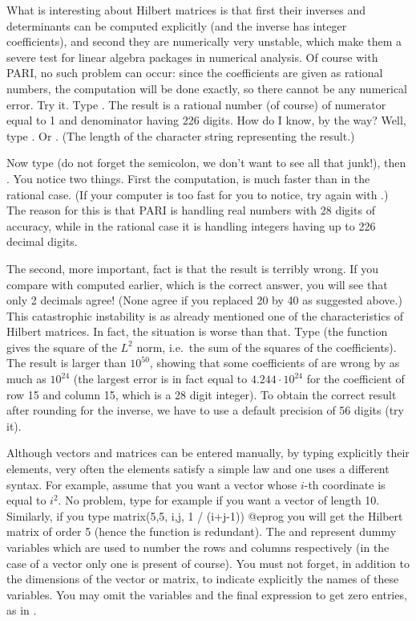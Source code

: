 What is interesting about Hilbert matrices is that first their inverses and
determinants can be computed explicitly (and the inverse has integer
coefficients), and second they are numerically very unstable, which make them
a severe test for linear algebra packages in numerical analysis.  Of course
with PARI, no such problem can occur: since the coefficients are given as
rational numbers, the computation will be done exactly, so there cannot be
any numerical error. Try it. Type . The result is a
rational number (of course) of numerator equal to 1 and denominator having
226 digits. How do I know, by the way? Well, type . Or
. (The length of the character string representing the
result.)

Now type  (do not forget the semicolon, we don't want to see
all that junk!), then . You notice two things. First the
computation, is much faster than in the rational case. (If your computer is
too fast for you to notice, try again with .) The
reason for this is that PARI is handling real numbers with 28 digits of
accuracy, while in the rational case it is handling integers having up to 226
decimal digits.

The second, more important, fact is that the result is terribly wrong. If you
compare with  computed earlier, which is the correct answer, you
will see that only 2 decimals agree! (None agree if you replaced 20 by 40 as
suggested above.) This catastrophic instability is as already mentioned one
of the characteristics of Hilbert matrices. In fact, the situation is
worse than that. Type  (the function 
gives the square of the $L^2$ norm, i.e.~the sum of the squares of the
coefficients). The result is larger than $10^{50}$, showing that some
coefficients of  are wrong by as much as $10^{24}$ (the largest
error is in fact equal to $4.244 \cdot 10^{24}$ for the coefficient of row 15
and column 15, which is a 28 digit integer). To obtain the correct result
after rounding for the inverse, we have to use a default precision of 56
digits (try it). 

Although vectors and matrices can be entered manually, by typing explicitly
their elements, very often the elements satisfy a simple law and one uses a
different syntax. For example, assume that you want a vector whose $i$-th
coordinate is equal to $i^2$. No problem, type for example
 if you want a vector of length 10. Similarly, if
you type
\bprog
  matrix(5,5, i,j, 1 / (i+j-1))
@eprog\noindent
you will get the Hilbert matrix of order 5 (hence the 
function is redundant).  The  and  represent dummy variables
which are used to number the rows and columns respectively (in the case of a
vector only one is present of course). You must not forget, in addition to
the dimensions of the vector or matrix, to indicate explicitly the names of
these variables. You may omit the variables and the final expression to get
zero entries, as in .

